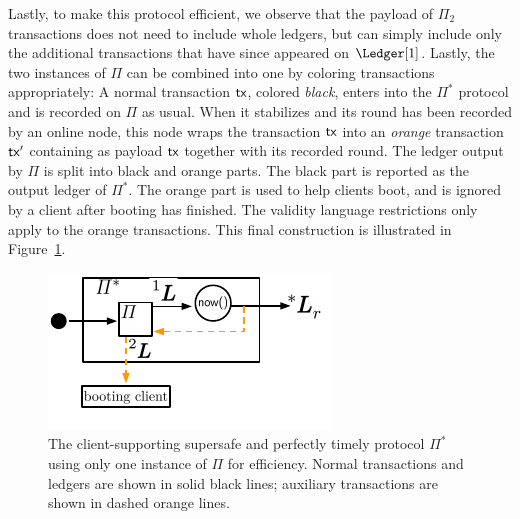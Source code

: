 Lastly, to make this protocol efficient, we observe that the payload of
$\Pi_2$ transactions does not need to include whole ledgers, but can simply
include only the additional transactions that have since appeared on $\Ledger[1]$.
Lastly, the two instances of $\Pi$ can be combined into one by coloring
transactions appropriately: A normal transaction $\textsf{tx}$, colored \emph{black}, enters into the
$\Pi^*$ protocol and is recorded on $\Pi$ as usual. When it stabilizes and its round
has been recorded by an online node, this node wraps the transaction $\textsf{tx}$ into an
\emph{orange} transaction $\textsf{tx}'$ containing as payload $\textsf{tx}$ together with its recorded
round. The ledger output by $\Pi$ is split into black and orange parts. The black part
is reported as the output ledger of $\Pi^*$. The orange part is used to help clients boot,
and is ignored by a client after booting has finished. The validity language restrictions
only apply to the orange transactions. This final construction is illustrated in
Figure~\ref{fig:client-support-feedback}.

\begin{figure}
  \centering
  \includegraphics[width=0.55\columnwidth,keepaspectratio]{figures/perfectly-timely-clients-feedback.pdf}
  \caption{The client-supporting supersafe and perfectly timely protocol $\Pi^*$
           using only one instance of $\Pi$ for efficiency.
           Normal transactions and ledgers are shown in solid black lines;
           auxiliary transactions are shown in dashed
           orange lines.}
 \label{fig:client-support-feedback}
\end{figure}

